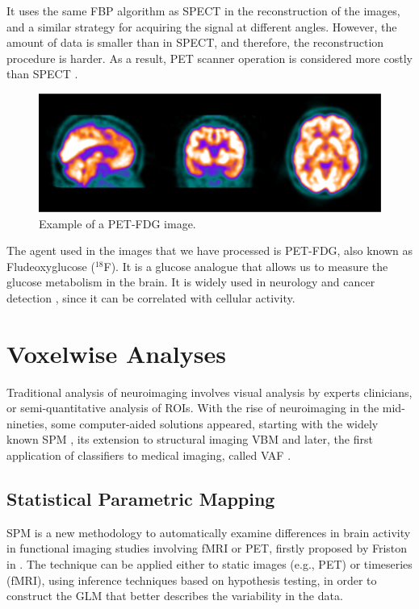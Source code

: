 It uses the same \ac{FBP} algorithm as \ac{SPECT} in the reconstruction of the images, and a similar strategy for acquiring the signal at different angles. However, the amount of data is smaller than in \ac{SPECT}, and therefore, the reconstruction procedure is harder. As a result, \ac{PET} scanner operation is considered more costly than \ac{SPECT} \cite{Carlson2016}.  

\begin{figure}[htp]
	\centering
	\includegraphics[width=0.7\linewidth]{Graphics/ch1/example_PET}
	\caption[Example of a PET-FDG image.]{Example of a PET-FDG image.}
	\label{fig:example_PET}
\end{figure}

The agent used in the images that we have processed is PET-FDG, also known as Fludeoxyglucose ($^{18}$F). It is a glucose analogue that allows us to measure the glucose metabolism in the brain. It is widely used in neurology \cite{Newberg2002} and cancer detection \cite{Kelloff2005}, since it can be correlated with cellular activity. 


\section{Voxelwise Analyses}
Traditional analysis of neuroimaging involves visual analysis by experts clinicians, or semi-quantitative analysis of \acp{ROI}. With the rise of neuroimaging in the mid-nineties, some computer-aided solutions appeared, starting with the widely known \acf{SPM} \cite{Friston1994}, its extension to structural imaging \acf{VBM} \cite{Ashburner2000} and later, the first application of classifiers to medical imaging, called \acf{VAF} \cite{Stoeckel04}.

\subsection{Statistical Parametric Mapping}
\acf{SPM} is a new methodology to automatically examine differences in brain activity in functional imaging studies involving \ac{fMRI} or \ac{PET}, firstly proposed by Friston in \cite{Friston1994}. The technique can be applied either to static images (e.g., \ac{PET}) or timeseries (\ac{fMRI}), using inference techniques based on hypothesis testing, in order to construct the \ac{GLM} that better describes the variability in the data. 

